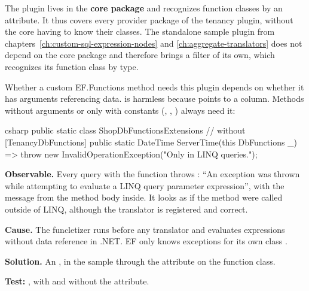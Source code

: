 The plugin lives in the \textbf{core package} and recognizes function classes by an
attribute. It thus covers every provider package of the tenancy plugin, without the core
having to know their classes. The standalone sample plugin from
chapters~\ref{ch:custom-sql-expression-nodes} and \ref{ch:aggregate-translators} does not depend
on the core package and therefore brings a filter of its own, which recognizes its function
class by type.

Whether a custom EF.Functions method needs this plugin depends on whether it has arguments
referencing data.
 is
harmless because  points to a column. Methods without arguments or
only with constants (,
, ) always need it:

\begin{sourcecode}{csharp}
public static class ShopDbFunctionsExtensions          // without [TenancyDbFunctions]
{
    public static DateTime ServerTime(this DbFunctions _)
        => throw new InvalidOperationException("Only in LINQ queries.");
}
\end{sourcecode}

\begin{failure}
  \textbf{Observable.} Every query with the function throws
  : “An exception was thrown
  while attempting to evaluate a LINQ query parameter expression”, with the message from the
  method body inside. It looks as if the method were called outside of LINQ, although the
  translator is registered and correct.

  \textbf{Cause.} The funcletizer runs before any translator and evaluates expressions
  without data reference in .NET. EF only knows exceptions for its own class
  .

  \textbf{Solution.} An
  , in the
  sample through the attribute on the function class.

  \textbf{Test:}
  ,
  with and without the attribute.
\end{failure}

